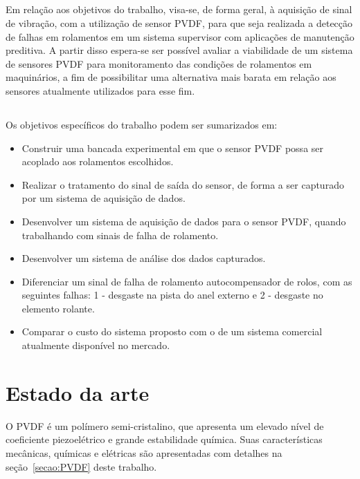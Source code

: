 \documentclass[
	12pt,				
	oneside,			
	a4paper,			
	english,			
	brazil,			
	]{abntex2ppgsi}
\begin{document}
\section{}

Em relação aos objetivos do trabalho, visa-se, de forma geral, à aquisição de sinal de vibração, com a utilização de sensor PVDF, para que seja realizada a detecção de falhas em rolamentos em um sistema supervisor com aplicações de manutenção preditiva. A partir disso espera-se ser possível avaliar a viabilidade de um sistema de sensores PVDF para monitoramento das condições de rolamentos em maquinários, a fim de possibilitar uma alternativa mais barata em relação aos sensores atualmente utilizados para esse fim.

\section{}

Os objetivos específicos do trabalho podem ser sumarizados em:

\begin{itemize}
	\item Construir uma bancada experimental em que o sensor PVDF possa ser acoplado aos rolamentos escolhidos.
	\item Realizar o tratamento do sinal de saída do sensor, de forma a ser capturado por um sistema de aquisição de dados.
	\item Desenvolver um sistema de aquisição de dados para o sensor PVDF, quando trabalhando com sinais de falha de rolamento.
	\item Desenvolver um sistema de análise dos dados capturados.
	\item Diferenciar um sinal de falha de rolamento autocompensador de rolos, com as seguintes falhas: 1 - desgaste na pista do anel externo e 2 - desgaste no elemento rolante.
	\item Comparar o custo do sistema proposto com o de um sistema comercial atualmente disponível no mercado.
\end{itemize}

\newpage
\chapter{\textbf{Estado da arte}}

O PVDF é um polímero semi-cristalino, que apresenta um elevado nível de coeficiente piezoelétrico e grande estabilidade química. Suas características mecânicas, químicas e elétricas são apresentadas com detalhes na seção~\ref{secao:PVDF} deste trabalho. 
\end{document}
